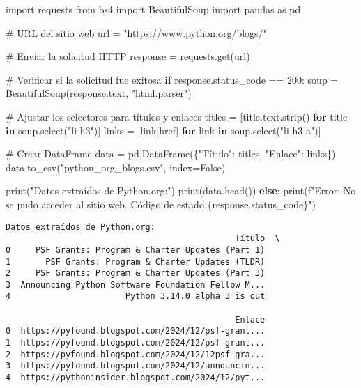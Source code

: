 \documentclass[
  letterpaper,
  DIV=11,
  numbers=noendperiod]{scrartcl}
\newenvironment{Shaded}{\begin{snugshade}}{\end{snugshade}}
\newcommand{\BuiltInTok}[1]{\textcolor[rgb]{0.00,0.23,0.31}{#1}}
\newcommand{\CommentTok}[1]{\textcolor[rgb]{0.37,0.37,0.37}{#1}}
\newcommand{\ControlFlowTok}[1]{\textcolor[rgb]{0.00,0.23,0.31}{\textbf{#1}}}
\newcommand{\DecValTok}[1]{\textcolor[rgb]{0.68,0.00,0.00}{#1}}
\newcommand{\ImportTok}[1]{\textcolor[rgb]{0.00,0.46,0.62}{#1}}
\newcommand{\KeywordTok}[1]{\textcolor[rgb]{0.00,0.23,0.31}{\textbf{#1}}}
\newcommand{\NormalTok}[1]{\textcolor[rgb]{0.00,0.23,0.31}{#1}}
\newcommand{\OperatorTok}[1]{\textcolor[rgb]{0.37,0.37,0.37}{#1}}
\newcommand{\SpecialCharTok}[1]{\textcolor[rgb]{0.37,0.37,0.37}{#1}}
\newcommand{\SpecialStringTok}[1]{\textcolor[rgb]{0.13,0.47,0.30}{#1}}
\newcommand{\StringTok}[1]{\textcolor[rgb]{0.13,0.47,0.30}{#1}}
\newcommand{\VariableTok}[1]{\textcolor[rgb]{0.07,0.07,0.07}{#1}}
\begin{document}
\begin{Shaded}
\begin{Highlighting}[]
\ImportTok{import}\NormalTok{ requests}
\ImportTok{from}\NormalTok{ bs4 }\ImportTok{import}\NormalTok{ BeautifulSoup}
\ImportTok{import}\NormalTok{ pandas }\ImportTok{as}\NormalTok{ pd}

\CommentTok{\# URL del sitio web}
\NormalTok{url }\OperatorTok{=} \StringTok{"https://www.python.org/blogs/"}

\CommentTok{\# Enviar la solicitud HTTP}
\NormalTok{response }\OperatorTok{=}\NormalTok{ requests.get(url)}

\CommentTok{\# Verificar si la solicitud fue exitosa}
\ControlFlowTok{if}\NormalTok{ response.status\_code }\OperatorTok{==} \DecValTok{200}\NormalTok{:}
\NormalTok{    soup }\OperatorTok{=}\NormalTok{ BeautifulSoup(response.text, }\StringTok{"html.parser"}\NormalTok{)}

    \CommentTok{\# Ajustar los selectores para títulos y enlaces}
\NormalTok{    titles }\OperatorTok{=}\NormalTok{ [title.text.strip() }\ControlFlowTok{for}\NormalTok{ title }\KeywordTok{in}\NormalTok{ soup.select(}\StringTok{"li h3"}\NormalTok{)]}
\NormalTok{    links }\OperatorTok{=}\NormalTok{ [link[}\StringTok{\textquotesingle{}href\textquotesingle{}}\NormalTok{] }\ControlFlowTok{for}\NormalTok{ link }\KeywordTok{in}\NormalTok{ soup.select(}\StringTok{"li h3 a"}\NormalTok{)]}

    \CommentTok{\# Crear DataFrame}
\NormalTok{    data }\OperatorTok{=}\NormalTok{ pd.DataFrame(\{}\StringTok{"Título"}\NormalTok{: titles, }\StringTok{"Enlace"}\NormalTok{: links\})}
\NormalTok{    data.to\_csv(}\StringTok{"python\_org\_blogs.csv"}\NormalTok{, index}\OperatorTok{=}\VariableTok{False}\NormalTok{)}

    \BuiltInTok{print}\NormalTok{(}\StringTok{"Datos extraídos de Python.org:"}\NormalTok{)}
    \BuiltInTok{print}\NormalTok{(data.head())}
\ControlFlowTok{else}\NormalTok{:}
    \BuiltInTok{print}\NormalTok{(}\SpecialStringTok{f"Error: No se pudo acceder al sitio web. Código de estado }\SpecialCharTok{\{}\NormalTok{response}\SpecialCharTok{.}\NormalTok{status\_code}\SpecialCharTok{\}}\SpecialStringTok{"}\NormalTok{)}
\end{Highlighting}
\end{Shaded}

\begin{verbatim}
Datos extraídos de Python.org:
                                              Título  \
0     PSF Grants: Program & Charter Updates (Part 1)   
1       PSF Grants: Program & Charter Updates (TLDR)   
2     PSF Grants: Program & Charter Updates (Part 3)   
3  Announcing Python Software Foundation Fellow M...   
4                       Python 3.14.0 alpha 3 is out   

                                              Enlace  
0  https://pyfound.blogspot.com/2024/12/psf-grant...  
1  https://pyfound.blogspot.com/2024/12/psf-grant...  
2  https://pyfound.blogspot.com/2024/12/12psf-gra...  
3  https://pyfound.blogspot.com/2024/12/announcin...  
4  https://pythoninsider.blogspot.com/2024/12/pyt...  
\end{verbatim}
\end{document}
